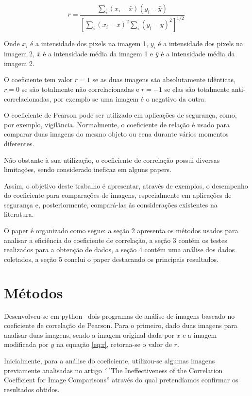 \documentclass[10pt,a4paper]{article}
\begin{document}
\begin{equation}r = \frac{  
    \displaystyle{\sum_{i} (x_i-\bar{x})(y_i-  
      \bar{y})}}{\displaystyle{\left[  
        \sum_{i}(x_i-\bar{x})^2  
        \sum_{i}(y_i-\bar{y})^2\right]^{1/2}}}  \label{eq:r}
\end{equation}  

Onde $x_i$ é a intensidade dos pixels na imagem 1, $y_i$ é a
intensidade dos pixels na imagem 2, $\bar{x}$ é a intensidade média da
imagem 1 e $\bar{y}$ é a intensidade média da imagem 2.

O coeficiente tem valor $r=1$ se as duas imagens são absolutamente
idênticas, $r=0$ se são totalmente não correlacionadas e $r=-1$ se elas
são totalmente anti-correlacionadas, por exemplo se uma imagem é o
negativo da outra.

O coeficiente de Pearson pode ser utilizado em
aplicações de segurança, como, por exemplo, vigilância. Normalmente, 
o coeficiente de relação é usado para comparar duas imagens do mesmo
objeto ou cena durante vários momentos diferentes.

Não obstante à sua utilização, o coeficiente de correlação possui
diversas limitações, sendo considerado ineficaz em alguns papers.%

Assim, o objetivo deste trabalho é apresentar, através de exemplos, o
desempenho do coeficiente para comparações de imagens, especialmente
em aplicações de segurança e, posteriormente, compará-las às considerações existentes na literatura.

 O paper é organizado como segue: a seção 2 apresenta os métodos usados para
 analisar a eficiência do coeficiente de correlação, a seção 3 contém
 os testes realizados para a obtenção de dados, a seção 4 contém uma
 análise dos dados coletados, a seção 5 conclui o paper destacando os principais resultados. 
\section{Métodos}

Desenvolveu-se em python~\cite{python} dois programas de análise de imagens baseado no
coeficiente de correlação de Pearson. Para o primeiro, dado duas imagens para analisar duas imagens, sendo a imagem original dada por $x$  e a
imagem modificada por $y$ na equação \eqref{eq:r}, retorna-se o valor de $r$.

Inicialmente, para a análise do coeficiente, utilizou-se algumas imagens
previamente analisadas no artigo ´´The Ineffectiveness of the Correlation
Coefficient for Image Comparisons'' através do qual pretendíamos
confirmar os resultados obtidos.
\end{document}
